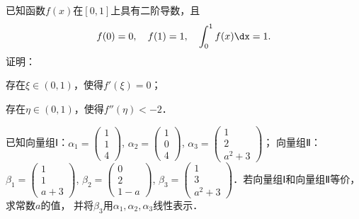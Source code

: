 \documentclass[plain,noanswer,medmath]{../../template/jnuexam}
\begin{document}
\begin{problem}[points=11]
已知函数$f(x)$在$[0,1]$上具有二阶导数，且
$$f(0) = 0,\quad f(1) = 1,\quad \int_0^1 f(x)\dx = 1.$$
证明：
\begin{enumerate*}
\item 存在$\xi \in(0,1)$，使得$f'(\xi) = 0$；
\item 存在$\eta \in(0,1)$，使得$f''(\eta) < - 2$．
\end{enumerate*}
\end{problem}


\begin{problem}[points=11]
已知向量组Ⅰ：$\alpha_1 = \begin{pmatrix}
  1 \\
  1 \\
  4
\end{pmatrix}$, $\alpha_2 = \begin{pmatrix}
  1 \\
  0 \\
  4
\end{pmatrix}$, $\alpha_3 = \begin{pmatrix}
  1 \\
  2 \\
  a^2 + 3
\end{pmatrix}$；
向量组Ⅱ：$\beta_1 = \begin{pmatrix}
  1 \\
  1 \\
  a + 3
\end{pmatrix}$, $\beta_2 = \begin{pmatrix}
  0 \\
  2 \\
  1 - a
\end{pmatrix}$, $\beta_3 = \begin{pmatrix}
  1 \\
  3 \\
  a^2 + 3
\end{pmatrix}$．若向量组Ⅰ和向量组Ⅱ等价，求常数$a$的值，
并将$\beta_3$用$\alpha_1,\alpha_2,\alpha_3$线性表示．
\end{problem}


\end{document}
